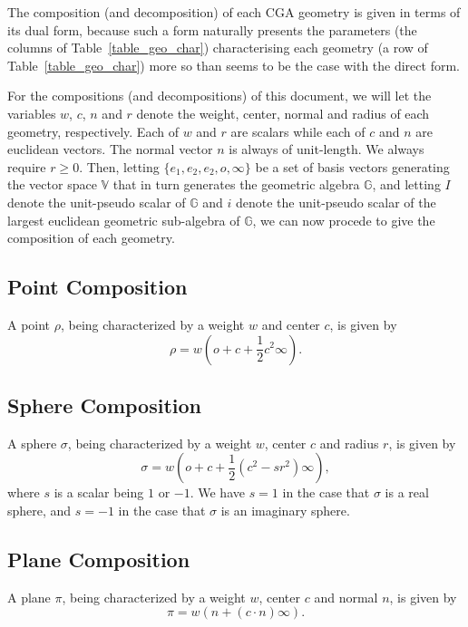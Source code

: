 \documentclass[12pt]{article}
\newcommand{\G}{\mathbb{G}}
\newcommand{\V}{\mathbb{V}}
\newcommand{\nvao}{o}
\newcommand{\nvai}{\infty}
\begin{document}
The composition (and decomposition) of each CGA geometry is given in terms of its
dual form, because such a form naturally presents the parameters (the columns of
Table~\ref{table_geo_char}) characterising each geometry (a row of Table~\ref{table_geo_char})
more so than seems to be the case with the direct form.

For the compositions (and decompositions) of this document, we will let the variables $w$,
$c$, $n$ and $r$ denote the weight, center, normal and radius of each geometry, respectively.
Each of $w$ and $r$ are scalars while each of $c$ and $n$ are euclidean vectors.  The normal vector
$n$ is always of unit-length.  We always require $r\geq 0$.
Then, letting $\{e_1,e_2,e_2,\nvao,\nvai\}$ be a set of basis vectors generating the
vector space $\V$ that in turn generates the geometric algebra $\G$, and
letting $I$ denote the unit-pseudo scalar of $\G$ and $i$ denote the
unit-pseudo scalar of the largest euclidean geometric sub-algebra of $\G$,
we can now procede to give the composition of each geometry.

\subsection{Point Composition}

A point $\rho$, being characterized by a weight $w$ and center $c$, is given by
\begin{equation}\label{equ_point}
\rho = w\left(\nvao + c + \frac{1}{2}c^2\nvai\right).
\end{equation}

\subsection{Sphere Composition}

A sphere $\sigma$, being characterized by a weight $w$, center $c$ and radius $r$,
is given by
\begin{equation}\label{equ_sphere}
\sigma = w\left(\nvao + c + \frac{1}{2}(c^2-sr^2)\nvai\right),
\end{equation}
where $s$ is a scalar being $1$ or $-1$.  We have $s=1$ in the
case that $\sigma$ is a real sphere, and $s=-1$ in the case that
$\sigma$ is an imaginary sphere.

\subsection{Plane Composition}

A plane $\pi$, being characterized by a weight $w$, center $c$ and normal $n$, is
given by
\begin{equation}\label{equ_plane}
\pi = w\left(n + (c\cdot n)\nvai\right).
\end{equation}
\end{document}
